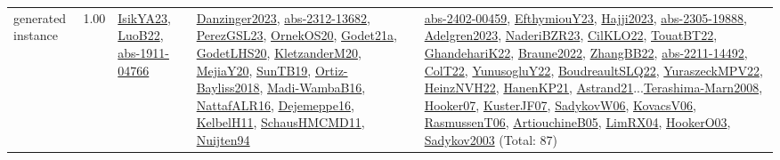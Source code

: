 {\begin{longtable}{p{3cm}r>{\raggedright\arraybackslash}p{6cm}>{\raggedright\arraybackslash}p{6cm}>{\raggedright\arraybackslash}p{8cm}}
\index{generated instance}\index{Benchmarks!generated instance}generated instance &  1.00 & \hyperref[detail:IsikYA23]{IsikYA23}, \hyperref[detail:LuoB22]{LuoB22}, \hyperref[detail:abs-1911-04766]{abs-1911-04766} & \hyperref[detail:Danzinger2023]{Danzinger2023}, \hyperref[detail:abs-2312-13682]{abs-2312-13682}, \hyperref[detail:PerezGSL23]{PerezGSL23}, \hyperref[detail:OrnekOS20]{OrnekOS20}, \hyperref[detail:Godet21a]{Godet21a}, \hyperref[detail:GodetLHS20]{GodetLHS20}, \hyperref[detail:KletzanderM20]{KletzanderM20}, \hyperref[detail:MejiaY20]{MejiaY20}, \hyperref[detail:SunTB19]{SunTB19}, \hyperref[detail:Ortiz-Bayliss2018]{Ortiz-Bayliss2018}, \hyperref[detail:Madi-WambaB16]{Madi-WambaB16}, \hyperref[detail:NattafALR16]{NattafALR16}, \hyperref[detail:Dejemeppe16]{Dejemeppe16}, \hyperref[detail:KelbelH11]{KelbelH11}, \hyperref[detail:SchausHMCMD11]{SchausHMCMD11}, \hyperref[detail:Nuijten94]{Nuijten94} & \hyperref[detail:abs-2402-00459]{abs-2402-00459}, \hyperref[detail:EfthymiouY23]{EfthymiouY23}, \hyperref[detail:Hajji2023]{Hajji2023}, \hyperref[detail:abs-2305-19888]{abs-2305-19888}, \hyperref[detail:Adelgren2023]{Adelgren2023}, \hyperref[detail:NaderiBZR23]{NaderiBZR23}, \hyperref[detail:CilKLO22]{CilKLO22}, \hyperref[detail:TouatBT22]{TouatBT22}, \hyperref[detail:GhandehariK22]{GhandehariK22}, \hyperref[detail:Braune2022]{Braune2022}, \hyperref[detail:ZhangBB22]{ZhangBB22}, \hyperref[detail:abs-2211-14492]{abs-2211-14492}, \hyperref[detail:ColT22]{ColT22}, \hyperref[detail:YunusogluY22]{YunusogluY22}, \hyperref[detail:BoudreaultSLQ22]{BoudreaultSLQ22}, \hyperref[detail:YuraszeckMPV22]{YuraszeckMPV22}, \hyperref[detail:HeinzNVH22]{HeinzNVH22}, \hyperref[detail:HanenKP21]{HanenKP21}, \hyperref[detail:Astrand21]{Astrand21}...\hyperref[detail:Terashima-Marn2008]{Terashima-Marn2008}, \hyperref[detail:Hooker07]{Hooker07}, \hyperref[detail:KusterJF07]{KusterJF07}, \hyperref[detail:SadykovW06]{SadykovW06}, \hyperref[detail:KovacsV06]{KovacsV06}, \hyperref[detail:RasmussenT06]{RasmussenT06}, \hyperref[detail:ArtiouchineB05]{ArtiouchineB05}, \hyperref[detail:LimRX04]{LimRX04}, \hyperref[detail:HookerO03]{HookerO03}, \hyperref[detail:Sadykov2003]{Sadykov2003} (Total: 87)\\

\end{longtable}}
